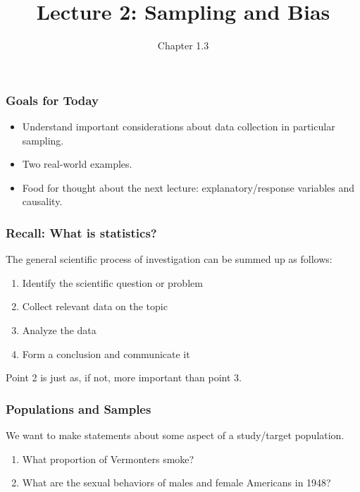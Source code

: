 \documentclass[handout]{beamer}
\title{Lecture 2: Sampling and Bias}
\author{Chapter 1.3}
\date{}
\newcommand{\blue}[1]{\textcolor{blue2}{#1}}
\begin{document}
\begin{frame}
\titlepage
\end{frame}


\begin{frame}
\frametitle{Goals for Today}
\begin{itemize}
  \item Understand important considerations about data collection in particular \blue{sampling}.
  \item Two real-world examples.
  \item Food for thought about the next lecture: explanatory/response variables and causality.  
\end{itemize}

\end{frame}


\begin{frame}
\frametitle{Recall:  What is statistics?}

The general scientific process of investigation can be summed up as follows:

\begin{enumerate}
\item Identify the scientific question or problem
\item Collect relevant data on the topic
\item Analyze the data
\item Form a conclusion and communicate it
\end{enumerate}

\pause Point 2 is just as, if not, more important than point 3.

\end{frame}


\begin{frame}
\frametitle{Populations and Samples}
We want to make statements about some aspect of a \blue{study/target population}.  

\begin{enumerate}
\item What proportion of Vermonters smoke?
\item What are the sexual behaviors of males and female Americans in 1948?
\end{enumerate}

\end{frame}
\end{document}
